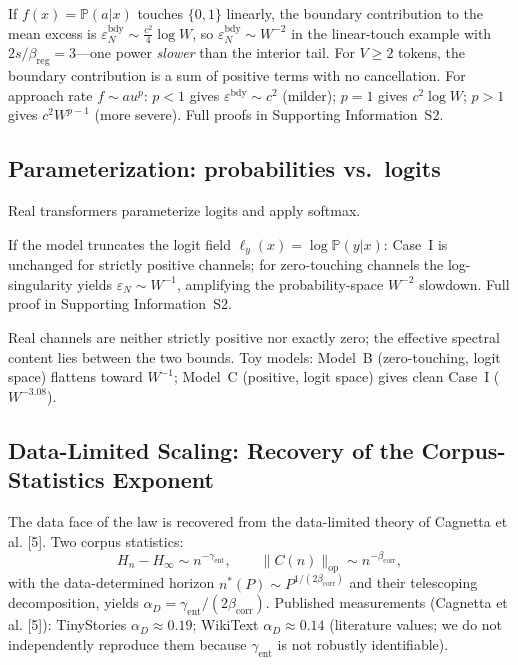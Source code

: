 \documentclass[entropy,article,submit,moreauthors,pdftex]{mdpi}
\newcommand{\eps}{\varepsilon}
\newcommand{\Prob}{\mathbb{P}}
\begin{document}
\begin{proposition}
\label{prop:boundary}
If $f(x)=\Prob(a|x)$ touches $\{0,1\}$ linearly, the boundary contribution to
the mean excess is $\eps_N^{\mathrm{bdy}}\sim\frac{c^2}{4}\log W$, so
$\eps_N^{\mathrm{bdy}}\sim W^{-2}$ in the linear-touch example with
$2s/\beta_{\mathrm{reg}}=3$---one power \emph{slower} than the interior tail.
For $V\!\ge\!2$ tokens, the boundary contribution is a sum of positive terms
with no cancellation.
For approach rate $f\sim au^p$: $p<1$ gives $\eps^{\mathrm{bdy}}\sim c^2$ (milder);
$p=1$ gives $c^2\log W$; $p>1$ gives $c^2 W^{p-1}$ (more severe).
Full proofs in Supporting Information~S2.
\end{proposition}

\subsection{Parameterization: probabilities vs.\ logits}
Real transformers parameterize logits and apply softmax.

\begin{proposition}
\label{prop:logit}
If the model truncates the logit field $\ell_y(x)=\log\Prob(y|x)$:
Case~I is unchanged for strictly positive channels; for zero-touching
channels the log-singularity yields $\eps_N\sim W^{-1}$, amplifying the
probability-space $W^{-2}$ slowdown.
Full proof in Supporting Information~S2.
\end{proposition}

\begin{remark}
\label{rem:logit}
Real channels are neither strictly positive nor exactly zero; the effective
spectral content lies between the two bounds.  Toy models: Model~B
(zero-touching, logit space) flattens toward $W^{-1}$; Model~C (positive, logit
space) gives clean Case~I ($W^{-3.08}$).
\end{remark}

\subsection{Data-Limited Scaling: Recovery of the Corpus-Statistics Exponent}
\label{sec:data}

The data face of the law is recovered from the data-limited theory of
Cagnetta et al. [5].  Two corpus statistics:
\begin{equation}
  H_n - H_\infty \sim n^{-\gamma_{\mathrm{ent}}},
  \qquad
  \|C(n)\|_{\mathrm{op}}\sim n^{-\beta_{\mathrm{corr}}},
  \label{eq:entropy}
\end{equation}
with the data-determined horizon $n^*(P)\sim P^{1/(2\beta_{\mathrm{corr}})}$ and
their telescoping decomposition, yields
$\alpha_D=\gamma_{\mathrm{ent}}/(2\beta_{\mathrm{corr}})$.
Published measurements (Cagnetta et al. [5]): TinyStories
$\alpha_D\!\approx\!0.19$; WikiText $\alpha_D\!\approx\!0.14$ (literature
values; we do not independently reproduce them because $\gamma_{\mathrm{ent}}$ is
not robustly identifiable).
\end{document}
